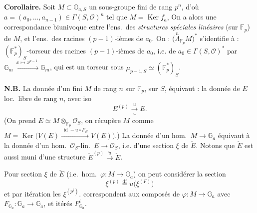 \documentclass[11pt,a4paper]{article}
\begin{document}
\textbf{Corollaire.} Soit $M \subset \mathbb{G}_{a,S}$ un sous-groupe fini 
 de rang $p^n$, d'où $a = (a_0, \dots, a_{n-1}) \in \Gamma(S, \mathcal{O})^n$
tel que $M = \operatorname{Ker} f_a$, 
On a alors une correspondance
biunivoque entre l'ens.\ des \emph{structures spéciales linéaires}
(sur $\mathbb{F}_p$) de $M$, et l'ens.\ des racines $(p-1)$-ièmes de $a_0$.
On  : $\bigl(\overset{n}{\Lambda}_{\mathbb{F}_p} M\bigr)^*$ s'identifie
à : $(\mathbb{F}_p^*)_S$-torseur des racines $(p-1)$-ièmes de $a_0$,
i.e.   de $a_0 \in \Gamma(S, \mathcal{O})^*$
par $\mathbb{G}_m \xrightarrow{\ x \mapsto x^{p-1}\ } \mathbb{G}_m$, qui est un
torseur sous $\mu_{p-1,S} \simeq (\mathbb{F}_p^*)_S$.

\textbf{N.B.} \struck{\ill{}} La donnée d'un  fini  \struck{\ill{}} $M$
de rang $n$ sur $\mathbb{F}_p$, sur $S$, équivaut : la donnée de $E$ loc.\ libre de
rang $n$, avec iso
\[
  E^{(p)} \xrightarrow[\ \sim\ ]{\ u\ } E .
\]
(On prend $E \simeq M \otimes_{\mathbb{F}_p} \mathcal{O}_S$, on récupère $M$
comme $M = \operatorname{Ker}\bigl(V(E) \xrightarrow{\ \operatorname{id} - u \circ F_E\ } V(E)\bigr)$.)
La donnée d'un hom.\ $M \to \mathbb{G}_a$ équivaut à la donnée d'un
hom.\ $\mathcal{O}_S$-lin.\ $E \to \mathcal{O}_S$, i.e. d'une section $\xi$
de $\check{E}$. Notons que $\check{E}$ est aussi muni d'une structure
$\check{E}^{(p)} \xrightarrow{\ \check{u}\ } \check{E}$.

Pour  section $\xi$ de $\check{E}$ (i.e.\ hom.\ $\varphi : M \to \mathbb{G}_a$)
on peut considérer la section
\[
  \xi^{(p)} \overset{\text{df}}{=} u\bigl(\xi^{(F)}\bigr)
\]
et par itération les $\xi^{(p^i)}$.   correspondent
aux composés de $\varphi : M \to \mathbb{G}_a$ avec
$F_{\mathbb{G}_a} : \mathbb{G}_a \to \mathbb{G}_a$, et   itérés
$F^i_{\mathbb{G}_a}$.
\end{document}
